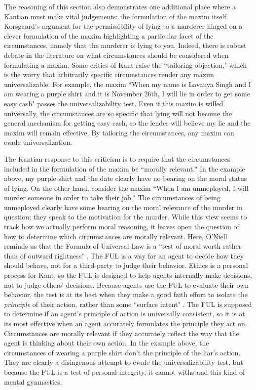 \begin{isabellebody}
\begin{isamarkuptext}
The reasoning of this section also demonstrates one additional place where a Kantian must make vital judgements:
the formulation of the maxim itself. Korsgaard's argument for the permissibility of lying to a 
murderer hinged on a clever formulation of the maxim highlighting a particular facet of the circumstances, 
namely that the murderer is lying to you. Indeed, there is robust debate in the literature on what
circumstances should be considered when formulating a maxim. Some critics of Kant raise the ``tailoring
objection," which is the worry that arbitrarily specific circumstances render any maxim universalizable. For 
example, the maxim ``When my name is Lavanya Singh and I am wearing a purple shirt and it is November 26th, 
I will lie in order to get some easy cash" passes the universalizability test. Even if this maxim is 
willed universally, the circumstances are so specific that lying will not become the general mechanism
for getting easy cash, so the lender will believe my lie and the maxim will remain effective. By tailoring
the circumstances, any maxim can evade universalization.

The Kantian response to this criticism is to require that the circumstances included in the formulation
of the maxim be ``morally relevant." In the example above, my purple shirt and the date clearly have no bearing on 
the moral status of lying. On the other hand, consider the maxim ``When I am unmeployed, I will murder
someone in order to take their job." The circumstances of being unmeployed clearly have some bearing on the moral
relevance of the murder in question; they speak to the motivation for the murder. While this view seems 
to track how we actually perform moral reasoning, it leaves open the question of how to determine
which circumstances are morally relevant. Here, O'Niell reminds us that the Formula of Universal Law is 
a ``test of moral worth rather than of outward rightness" \citep[98]{constofreason}. The FUL is a way 
for an agent to decide how they should behave, not for a third-party to judge their behavior. Ethics is 
a personal process for Kant, so the FUL is designed to help agents internally make decisions, not to 
judge others' decisions. Because agents use the FUL to evaluate their own behavior, the test is at its 
best when they make a good faith effort to isolate the \emph{principle} of their action, rather than some
``surface intent" \citep[87]{constofreason}. The FUL is supposed to determine if an agent's principle of action
is universally consistent, so it is at its most effective when an agent accurately formulates the principle
they act on. Circumstances are morally relevant if they accurately reflect the way that the agent is 
thinking about their own action. In the example above, the circumstances of wearing a purple shirt don't
the principle of the liar's action. They are clearly a disingenous attempt to evade the universalizability
test, but because the FUL is a test of personal integrity, it cannot withstand this kind of mental
gymnastics.


\end{isamarkuptext}
\end{isabellebody}
